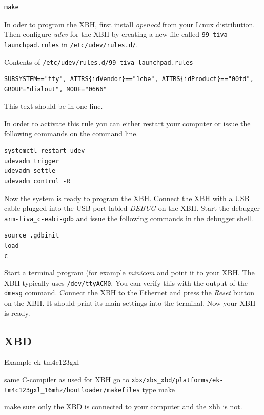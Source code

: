 \documentclass[twoside,11pt]{cergdoc}
\begin{document}
\begin{lstlisting}
make
\end{lstlisting}

In oder to program the XBH, first install \emph{openocd} from your Linux distribution.
Then configure \emph{udev} for the XBH by creating a new file called
\texttt{99-tiva-launchpad.rules} in \verb|/etc/udev/rules.d/|.

\begin{cergbox}{Contents of \texttt{/etc/udev/rules.d/99-tiva-launchpad.rules}}
\small\begin{lstlisting}
SUBSYSTEM=="tty", ATTRS{idVendor}=="1cbe", ATTRS{idProduct}=="00fd", 
GROUP="dialout", MODE="0666"
\end{lstlisting}
This text should be in one line.
\end{cergbox}

In order to activate this rule you can either restart your computer or issue the
following commands on the command line.

\begin{lstlisting}
systemctl restart udev 
udevadm trigger
udevadm settle
udevadm control -R
\end{lstlisting}

Now the system is ready to program the XBH. Connect the XBH with a USB cable plugged into
the USB port labled \emph{DEBUG} on the XBH. Start the debugger \verb|arm-tiva_c-eabi-gdb|
and issue the following commands in the debugger shell.

\begin{lstlisting}
source .gdbinit
load
c
\end{lstlisting}

Start a terminal program (for example \emph{minicom} 
and point it to your XBH. The XBH typically uses \verb|/dev/ttyACM0|.
You can verify this with the output of the \texttt{dmesg} command. Connect the XBH to the
Ethernet and press the \emph{Reset} button on the XBH. It should print its main 
settings into the terminal. Now your XBH is ready.

\subsection{XBD}
Example ek-tm4c123gxl

same C-compiler as used for XBH
go to 
\verb|xbx/xbs_xbd/platforms/ek-tm4c123gxl_16mhz/bootloader/makefiles|
type make

make sure only the XBD is connected to your computer and the xbh is not.
\end{document}
